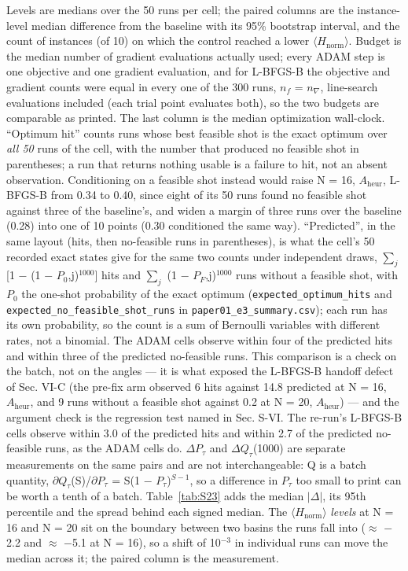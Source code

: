 \documentclass[journal]{IEEEtran}
\begin{document}
Levels are medians over the 50 runs per cell; the paired columns are the instance-level median difference from the baseline with its 95\% bootstrap interval, and the count of instances (of 10) on which the control reached a lower $\langle$$H_{\mathrm{norm}}$$\rangle$. Budget is the median number of gradient evaluations actually used; every ADAM step is one objective and one gradient evaluation, and for L-BFGS-B the objective and gradient counts were equal in every one of the 300 runs, $n_{f}$ = $n_{\nabla}$, line-search evaluations included (each trial point evaluates both), so the two budgets are comparable as printed. The last column is the median optimization wall-clock. ``Optimum hit'' counts runs whose best feasible shot is the exact optimum over \textit{all 50} runs of the cell, with the number that produced no feasible shot in parentheses; a run that returns nothing usable is a failure to hit, not an absent observation. Conditioning on a feasible shot instead would raise N = 16, $A_{\mathrm{heur}}$, L-BFGS-B from 0.34 to 0.40, since eight of its 50 runs found no feasible shot against three of the baseline's, and widen a margin of three runs over the baseline (0.28) into one of 10 points (0.30 conditioned the same way). ``Predicted'', in the same layout (hits, then no-feasible runs in parentheses), is what the cell's 50 recorded exact states give for the same two counts under independent draws, $\sum_{j}$ [1 $-$ (1 $-$ $P_{0}$,j)$^{1000}$] hits and $\sum_{j}$ (1 $-$ $P_{F}$,j)$^{1000}$ runs without a feasible shot, with $P_{0}$ the one-shot probability of the exact optimum (\texttt{expected\_optimum\_hits} and \texttt{expected\_no\_feasible\_shot\_runs} in \texttt{paper01\_e3\_summary.csv}); each run has its own probability, so the count is a sum of Bernoulli variables with different rates, not a binomial. The ADAM cells observe within four of the predicted hits and within three of the predicted no-feasible runs. This comparison is a check on the batch, not on the angles --- it is what exposed the L-BFGS-B handoff defect of Sec. VI-C (the pre-fix arm observed 6 hits against 14.8 predicted at N = 16, $A_{\mathrm{heur}}$, and 9 runs without a feasible shot against 0.2 at N = 20, $A_{\mathrm{heur}}$) --- and the argument check is the regression test named in Sec. S-VI. The re-run's L-BFGS-B cells observe within 3.0 of the predicted hits and within 2.7 of the predicted no-feasible runs, as the ADAM cells do. $\Delta$$P_{\tau}$ and $\Delta$$Q_{\tau}$(1000) are separate measurements on the same pairs and are not interchangeable: Q is a batch quantity, $\partial$$Q_{\tau}$(S)/$\partial$$P_{\tau}$ = S(1 $-$ $P_{\tau}$)$^{S-1}$, so a difference in $P_{\tau}$ too small to print can be worth a tenth of a batch. Table~\ref{tab:S23} adds the median $|$$\Delta$$|$, its 95th percentile and the spread behind each signed median. The $\langle$$H_{\mathrm{norm}}$$\rangle$ \textit{levels} at N = 16 and N = 20 sit on the boundary between two basins the runs fall into ($\approx$ $-$2.2 and $\approx$ $-$5.1 at N = 16), so a shift of 10$^{-3}$ in individual runs can move the median across it; the paired column is the measurement.
\end{document}
